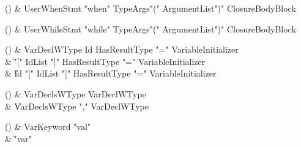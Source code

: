 \begin{bbgrammarappendix}{3.8in}

() & UserWhenStmt \label{prod:UserWhenStmt}  \:
 \xcd"when" TypeArgs\opt \xcd"(" ArgumentList\opt \xcd")" ClosureBodyBlock

\end{bbgrammarappendix}

\begin{bbgrammarappendix}{3.8in}

() & UserWhileStmt \label{prod:UserWhileStmt}  \:
         \xcd"while" TypeArgs\opt \xcd"(" ArgumentList\opt \xcd")" ClosureBodyBlock

\end{bbgrammarappendix}

\begin{bbgrammarappendix}{3.8in}

() & VarDeclWType \label{prod:VarDeclWType}  \: Id HasResultType \xcd"=" VariableInitializer  \\

 &    \| \xcd"[" IdList \xcd"]" HasResultType \xcd"=" VariableInitializer \\
 &    \| Id \xcd"[" IdList \xcd"]" HasResultType \xcd"=" VariableInitializer \\

\end{bbgrammarappendix}

\begin{bbgrammarappendix}{3.7in}

() & VarDeclsWType \label{prod:VarDeclsWType}  \: VarDeclWType  \\

 &    \| VarDeclsWType \xcd"," VarDeclWType \\

\end{bbgrammarappendix}

\begin{bbgrammarappendix}{4.0in}

() & VarKeyword \label{prod:VarKeyword}  \: \xcd"val"  \\

 &    \| \xcd"var" \\

\end{bbgrammarappendix}

